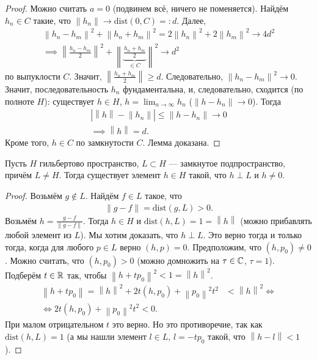 \begin{proof}
 Можно считать $a = 0$ (подвинем всё, ничего не поменяется). Найдём $h_n \in C$ такие, что $\left\| h_n \right\| \to \mathrm{dist}(0, C) =: d$. Далее, \begin{align*}
  \left\| h_n - h_m \right\|^{2} + \left\| h_n + h_m \right\|^{2} = 2 \left\| h_n \right\|^{2} + 2 \left\| h_m \right\|^{2} \to 4d^{2} \\
  \implies \left\| \frac{h_n - h_m}{2} \right\|^{2} + \left\| \underbrace{\frac{h_n + h_m}{2}}_{\in C} \right\|^{2} \to d^{2}
 \end{align*} по выпуклости $C$. Значит, $\left\| \frac{h_n + h_m}{2} \right\| \geqslant d$. Следовательно, $\left\| h_n - h_m \right\|^{2} \to 0$. Значит, последовательность $h_n$ фундаментальна, и, следовательно, сходится (по полноте $H$): существует $h \in H$, $h = \lim_{n \to \infty} h_n $ ($\left\| h - h_n \right\| \to 0$). Тогда \begin{align*}
  \left| \left\| h \right\| - \left\| h_n \right\| \right| \leqslant \left\| h - h_n \right\| \to 0 \\
  \implies \left\| h \right\| = d
 .\end{align*} Кроме того, $h \in C$ по замкнутости $C$. Лемма доказана.
\end{proof}
\begin{lm}
\label{lemma:orthogonal_element_in_hilbert_space}
 Пусть $H$ гильбертово пространство, $L \subset H$ --- замкнутое подпространство, причём $L \neq H$. Тогда существует элемент $h \in H$ такой, что $h \perp L$ и $h \neq 0$.
\end{lm}
\begin{proof}
 Возьмём $g \notin L$. Найдём $f \in L$ такое, что  \begin{align*}
  \left\| g - f \right\| = \mathrm{dist} \left( g, L \right) > 0
 .\end{align*}  Возьмём $h = \frac{g - f}{\left\| g - f \right\|}$. Тогда $h \in H$ и $\mathrm{dist}(h, L) = 1 = \left\| h \right\|$ (можно прибавлять любой элемент из $L$). Мы хотим доказать, что $h \perp L$. Это верно тогда и только тогда, когда для любого $p \in L$ верно $(h, p) = 0$. Предположим, что $(h, p_0) \neq 0$. Можно считать, что $(h, p_0) > 0$ (можно домножить на $\tau \in \mathbb{C}$, $\tau = 1$). Подберём $t \in \mathbb{R}$ так, чтобы $\left\| h + tp_0 \right\|^{2} < 1 = \left\| h \right\|^{2}$. \begin{align*}
 \left\| h + tp_0 \right\| = \left\| h \right\|^{2} + 2t(h, p_0) + \left\| p_0 \right\|^{2} t^{2} &< \left\| h \right\|^{2} \iff \\
  \iff  2t(h, p_0) + \left\| p_0 \right\|^{2} t^{2} < 0
 .\end{align*} При малом отрицательном $t$ это верно. Но это противоречие, так как $\mathrm{dist}(h, L) = 1$ (а мы нашли элемент $l \in L$, $l = -tp_0$ такой, что $\left\| h - l \right\| < 1$).
\end{proof}

